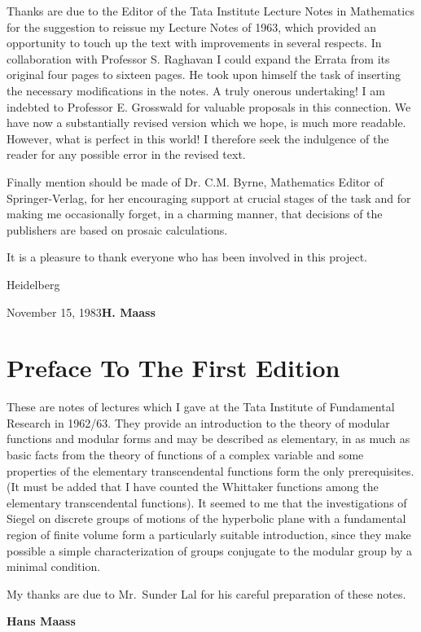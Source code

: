 Thanks are due to the Editor of the Tata Institute Lecture Notes in
Mathematics for the suggestion to reissue my Lecture Notes of 1963,
which provided an opportunity to touch up the text with improvements
in several respects. In collaboration with Professor S. Raghavan I
could expand the Errata from its original four pages to sixteen
pages. He took upon himself the task of inserting the necessary
modifications in the notes. A truly onerous undertaking! I am indebted
to Professor E. Grosswald for valuable proposals in this
connection. We have now a substantially revised version which we hope,
is much more readable. However, what is perfect in this world! I
therefore seek the indulgence of the reader for any possible error in
the revised text.

Finally mention should be made of Dr. C.M. Byrne, Mathematics
Editor of Springer-Verlag, for her encouraging support at crucial
stages of the task and for making me occasionally forget, in a
charming manner, that decisions of the publishers are based on prosaic
calculations.

It is a pleasure to thank everyone who has been involved in this
project.
\vskip 1cm

\noindent
Heidelberg
\medskip

\noindent
November 15, 1983\hfill {\large\bf H. Maass}\qquad 




\vfill
\eject

\thispagestyle{empty}


\chapter*{Preface To The First Edition}


These are notes of lectures which I gave at the Tata Institute of
Fundamental Research in 1962/63. They provide an introduction to the
theory of modular functions and modular forms and may be described as
elementary, in as much as basic facts from the theory of functions of
a complex variable and some properties of the elementary
transcendental functions form the only prerequisites. (It must be
added that I have counted the Whittaker functions among the elementary
transcendental functions). It seemed to me that the investigations of
Siegel on discrete groups of motions of the hyperbolic plane with a
fundamental region of finite volume form a particularly suitable
introduction, since they make possible a simple characterization of
groups conjugate to the modular group by a minimal condition.

My thanks are due to Mr.~Sunder Lal for his careful preparation of
these notes.
\vskip 1cm

\hfill {\large\bf Hans Maass}\qquad





